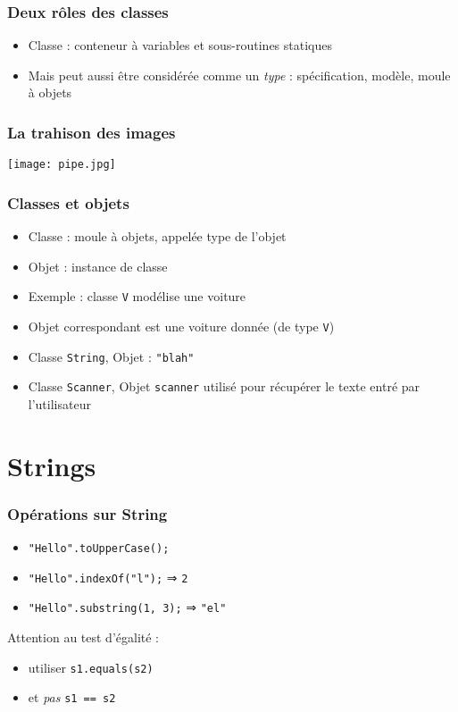 \documentclass[english, french]{beamer}
\begin{document}
\begin{frame}
	\frametitle{Deux rôles des classes}
	\begin{itemize}
		\item Classe : conteneur à variables et sous-routines statiques
		\item Mais peut aussi être considérée comme un \emph{type} : spécification, modèle, moule à objets
	\end{itemize}
\end{frame}

\begin{frame}
	\frametitle{La trahison des images}
	\centering\texttt{[image: pipe.jpg]}
\end{frame}

\begin{frame}
	\frametitle{Classes et objets}
	\begin{itemize}
		\item Classe : moule à objets, appelée type de l’objet
		\item Objet : instance de classe
		\item Exemple : classe \texttt{V} modélise une voiture
		\item Objet correspondant est une voiture donnée (de type \texttt{V})
		\item Classe \texttt{String}, Objet : \texttt{"blah"}
		\item Classe \texttt{Scanner}, Objet \texttt{scanner} utilisé pour récupérer le texte entré par l’utilisateur
	\end{itemize}
\end{frame}

\section{Strings}
\begin{frame}
	\frametitle{Opérations sur String}
	\begin{itemize}
		\item \texttt{"Hello".toUpperCase();}
		\item \texttt{"Hello".indexOf("l");} ⇒ \pause \texttt{2}
		\item \texttt{"Hello".substring(1, 3);} ⇒ \pause \texttt{"el"}
	\end{itemize}
	Attention au test d’égalité :
	\begin{itemize}
		\item[\mkkOK] utiliser \texttt{s1.equals(s2)} 
		\item[\mkkNO] et \emph{pas} \texttt{s1 == s2}
	\end{itemize}
\end{frame}
\end{document}
